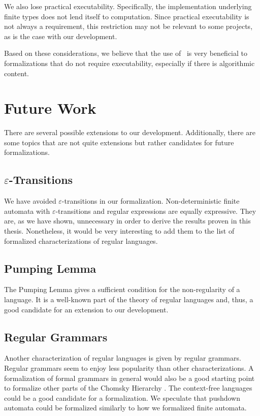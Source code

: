 We also lose practical executability. 
Specifically, the implementation underlying finite types does not lend itself to computation. 
Since practical executability is not always a requirement, this restriction may not be relevant to some projects, as is the case with our development.

Based on these considerations, we believe that the use of \ssreflect\ is very beneficial to formalizations that do not require executability, especially if there is algorithmic content. 



\section{Future Work}
There are several possible extensions to our development.
Additionally, there are some topics that are not quite extensions but rather candidates for future formalizations.


\subsection[$\varepsilon$-Transitions]{\texorpdfstring{$\varepsilon$-Transitions}{Epsilon-Transitions}}
We have avoided $\varepsilon$-transitions in our formalization. 
Non-deterministic finite automata with $\varepsilon$-transitions and regular expressions are equally expressive.
They are, as we have shown, unnecessary in order to derive the results proven in this thesis.
Nonetheless, it would be very interesting to add them to the list of formalized characterizations of regular languages.

\subsection{Pumping Lemma}
The Pumping Lemma \cite{BarHillelPerlesShamir61Formal} gives a sufficient condition for the non-regularity of a language. 
It is a well-known part of the theory of regular languages and, thus, a good candidate for an extension to our development.

\subsection{Regular Grammars}
Another characterization of regular languages is given by regular grammars.
Regular grammars seem to enjoy less popularity than other characterizations.
A formalization of formal grammars in general would also be a good starting point to formalize other parts of the
Chomsky Hierarchy \cite{Chomsky1956}. 
The context-free languages could be a good candidate for a formalization.
We speculate that pushdown automata could be formalized similarly to how we formalized finite automata.

